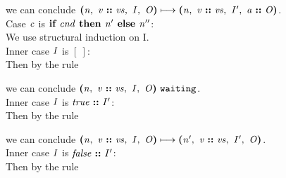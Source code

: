 \documentclass[12pt]{article}
\begin{document}
we can conclude
$\steps{
   \cfg{\nterm{n}}{\cons{\nterm{v}}{\nterm{vs}}}{\nterm{I}}{\nterm{O}}
 }{
   \cfg{\nterm{n}}{\cons{\nterm{v}}{\nterm{vs}}}{\nterm{I'}}{\cons{\nterm{a}}{\nterm{O}}}
 }$.\\

Case $\nterm{c}$ is $\ifelse{\nterm{cnd}}{\nterm{n'}}{\nterm{n''}}$:\\

We use structural induction on I.\\

Inner case $\nterm{I}$ is $[\ ]$:\\

Then by the rule

\begin{mathpar}
\end{mathpar}

we can conclude
$\waiting{\cfg{\nterm{n}}{\cons{\nterm{v}}{\nterm{vs}}}{\nterm{I}}{\nterm{O}}}$.\\

Inner case $\nterm{I}$ is $\cons{\nterm{true}}{\nterm{I'}}$:\\

Then by the rule

\begin{mathpar}
\end{mathpar}

we can conclude
$\steps{
   \cfg{\nterm{n}}{\cons{\nterm{v}}{\nterm{vs}}}{\nterm{I}}{\nterm{O}}
 }{
   \cfg{\nterm{n'}}{\cons{\nterm{v}}{\nterm{vs}}}{\nterm{I'}}{\nterm{O}}
 }$.\\

Inner case $\nterm{I}$ is $\cons{\nterm{false}}{\nterm{I'}}$:\\

Then by the rule

\begin{mathpar}
\end{mathpar}
\end{document}
